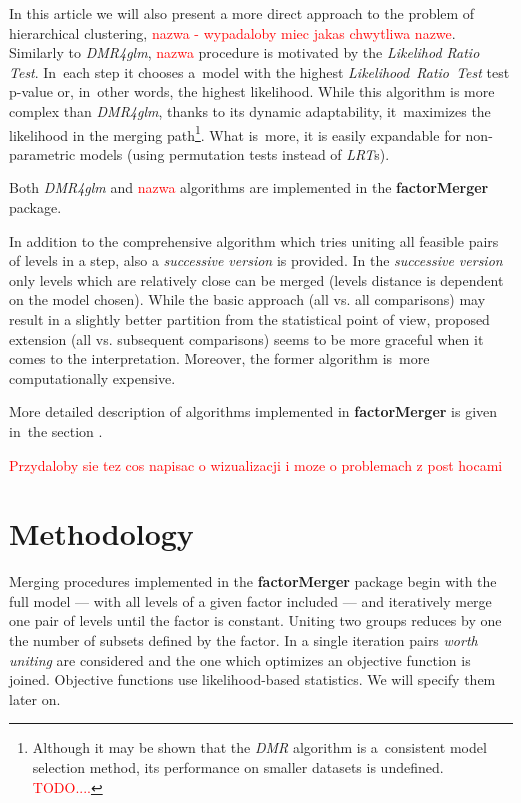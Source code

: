 \documentclass[12pt]{article}
\newcommand{\factorMerger}{\textbf{factorMerger }}
\newcommand{\todo}{\textcolor{red}}
\begin{document}
In this article we will also present a more direct approach to the problem of hierarchical clustering, \todo{nazwa - wypadaloby miec jakas chwytliwa nazwe}. 
Similarly to \emph{DMR4glm}, \todo{nazwa} procedure is motivated by the \emph{Likelihod Ratio Test}. In~each step it chooses a~model with the highest \emph{Likelihood~Ratio~Test} test p-value or, in~other words, the highest likelihood. While this algorithm is more complex than \emph{DMR4glm}, thanks to its dynamic adaptability, it~maximizes the likelihood in the merging path\footnote{Although it may be shown that the \emph{DMR} algorithm is a~consistent
model selection method, its performance on smaller datasets is undefined. \todo{TODO....}}. What is~more, it is easily expandable for non-parametric models (using permutation tests instead of \emph{LRT}s). 

Both \emph{DMR4glm} and \todo{nazwa} algorithms are implemented in the \factorMerger package.

In addition to the comprehensive algorithm which tries uniting all feasible pairs of levels in a step, also a \emph{successive version} is provided. In the \emph{successive version} only levels which are relatively close can be merged (levels distance is dependent on the model chosen). While the basic approach (all vs. all comparisons) may result in a slightly better partition from the statistical point of view, proposed extension (all vs. subsequent comparisons) seems to be more graceful when it comes to the interpretation. Moreover, the former algorithm is~more computationally expensive.

More detailed description of algorithms implemented in \factorMerger is given in~the section .

\todo{Przydaloby sie tez cos napisac o wizualizacji i moze o problemach z post hocami}

\section{Methodology}
\label{sec:meth}

Merging procedures implemented in the \factorMerger package begin with the full model --- with all levels of a given factor included --- and iteratively merge one pair of levels until the factor is constant. Uniting two groups reduces by one the number of subsets defined by the factor. In a single iteration pairs \emph{worth uniting} are considered and the one which optimizes an objective function is joined. Objective functions use likelihood-based statistics. We will specify them later on. 
\end{document}
